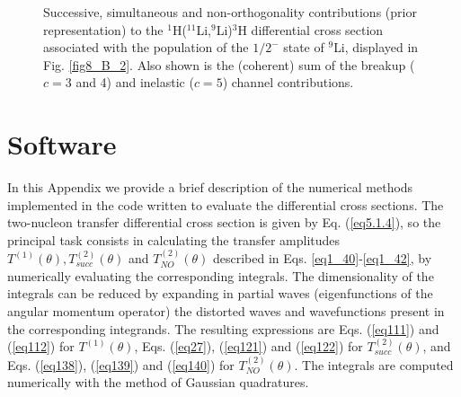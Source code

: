 \begin{subappendices}
\begin{figure}
        	\caption{Successive, simultaneous and non-orthogonality contributions (prior representation)
        	to the  $^1$H($^{11}$Li,$^9$Li)$^3$H differential cross section
        	associated with the population of the $1/2^-$ state
        	of $^9$Li, displayed in Fig. \ref{fig8_B_2}. Also shown is the (coherent) sum of the breakup ($c=3$ and 4) and inelastic ($c=5$) channel contributions.}\label{fig8_B_3}
        \end{figure}

\section{Software}\label{C8AppD}
In this Appendix we provide a brief description of the numerical methods implemented in the code written to evaluate the differential cross sections. The two-nucleon transfer differential cross section is given by Eq. (\ref{eq5.1.4}),  so the principal task consists in calculating the transfer amplitudes $T^{(1)}(\theta),T^{(2)}_{succ}(\theta)$ and $T^{(2)}_{NO}(\theta)$ described in Eqs. \ref{eq1_40}-\ref{eq1_42}, by numerically evaluating the corresponding integrals.  The dimensionality of the integrals  can be reduced by expanding in partial waves (eigenfunctions of the angular momentum operator) the distorted waves and wavefunctions present in the corresponding integrands. The resulting expressions are Eqs. (\ref{eq111}) and (\ref{eq112}) for $T^{(1)}(\theta)$, Eqs. (\ref{eq27}), (\ref{eq121}) and (\ref{eq122}) for $T^{(2)}_{succ}(\theta)$, and Eqs. (\ref{eq138}), (\ref{eq139}) and (\ref{eq140}) for $T^{(2)}_{NO}(\theta)$. The integrals are computed numerically with the method of Gaussian quadratures. 



\end{subappendices}
